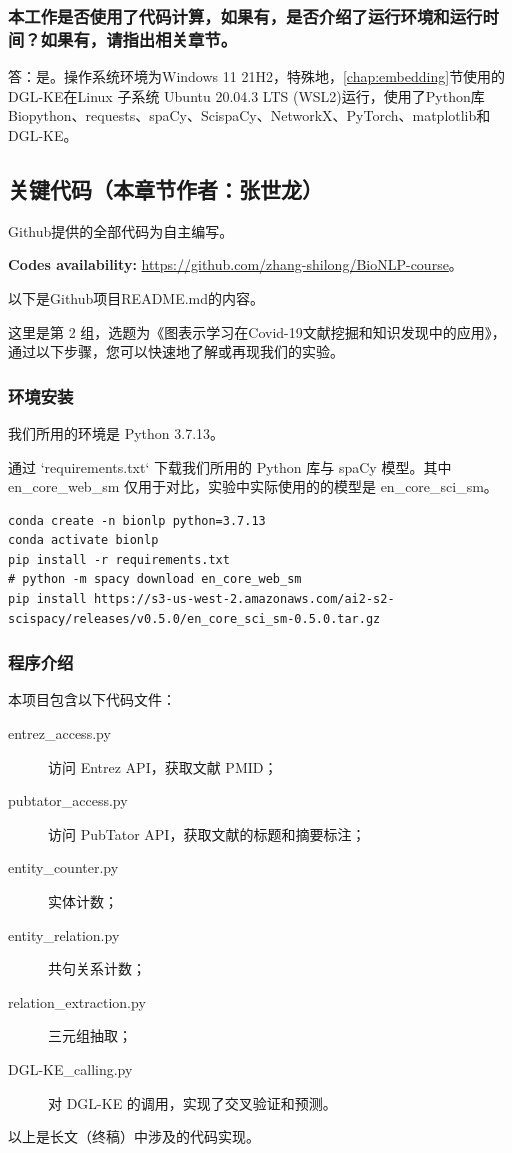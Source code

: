 \documentclass[twocolumn]{article}
\begin{document}
\subsubsection{本工作是否使用了代码计算，如果有，是否介绍了运行环境和运行时间？如果有，请指出相关章节。}
答：是。操作系统环境为Windows 11 21H2，特殊地，\ref{chap:embedding}节使用的DGL-KE在Linux 子系统 Ubuntu 20.04.3 LTS (WSL2)运行，使用了Python库Biopython、requests、spaCy、ScispaCy、NetworkX、PyTorch、matplotlib和DGL-KE。


\subsection{关键代码（本章节作者：张世龙）}

Github提供的全部代码为自主编写。\par
{\bf Codes availability:} \url{https://github.com/zhang-shilong/BioNLP-course}。\par
以下是Github项目README.md的内容。\par
这里是第 2 组，选题为《图表示学习在Covid-19文献挖掘和知识发现中的应用》，通过以下步骤，您可以快速地了解或再现我们的实验。\par
\subsubsection{环境安装}
我们所用的环境是 Python 3.7.13。\par
通过 `requirements.txt` 下载我们所用的 Python 库与 spaCy 模型。其中 en\_core\_web\_sm 仅用于对比，实验中实际使用的的模型是 en\_core\_sci\_sm。\par
\begin{lstlisting}
conda create -n bionlp python=3.7.13
conda activate bionlp
pip install -r requirements.txt
# python -m spacy download en_core_web_sm
pip install https://s3-us-west-2.amazonaws.com/ai2-s2-scispacy/releases/v0.5.0/en_core_sci_sm-0.5.0.tar.gz
\end{lstlisting}
\subsubsection{程序介绍}
本项目包含以下代码文件：\par
\begin{description}
	\item[entrez\_access.py] 访问 Entrez API，获取文献 PMID；
	\item[pubtator\_access.py] 访问 PubTator API，获取文献的标题和摘要标注；
	\item[entity\_counter.py] 实体计数；
	\item[entity\_relation.py] 共句关系计数；
	\item[relation\_extraction.py] 三元组抽取；
	\item[DGL-KE\_calling.py] 对 DGL-KE 的调用，实现了交叉验证和预测。
\end{description}\par
以上是长文（终稿）中涉及的代码实现。
\end{document}

